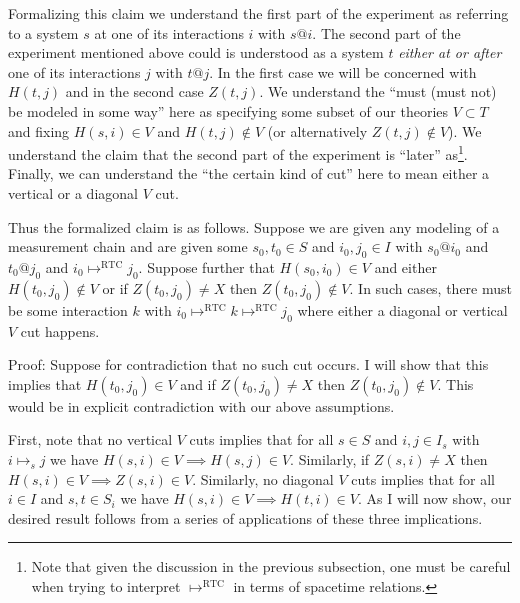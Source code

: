 \documentclass[prd,twocolumn,superscriptaddress,floatfix,amsmath,amssymb,amsfonts,nofootinbib]{revtex4-2}
\begin{document}
Formalizing this claim we understand the first part of the experiment as referring to a system $s$ at one of its interactions $i$ with $s@i$. The second part of the experiment mentioned above could is understood as a system $t$ \textit{either at or after} one of its interactions $j$ with $t@j$. In the first case we will be concerned with $H(t,j)$ and in the second case $Z(t,j)$. We understand the ``must (must not) be modeled in some way'' here as specifying some subset of our theories $V\subset T$ and fixing $H(s,i)\in V$ and $H(t,j)\notin V$ (or alternatively $Z(t,j)\notin V$). We understand the claim that the second part of the experiment is ``later'' as\footnote{Note that given the discussion in the previous subsection, one must be careful when trying to interpret $\mapsto^\text{RTC}$ in terms of spacetime relations.}. Finally, we can understand the ``the certain kind of cut'' here to mean either a vertical or a diagonal $V$ cut.%

Thus the formalized claim is as follows. Suppose we are given any modeling of a measurement chain and are given some $s_0,t_0\in S$ and $i_0,j_0\in I$ with $s_0@i_0$ and $t_0@j_0$ and \mbox{$i_0 \mapsto^\text{RTC}j_0$}. Suppose further that $H(s_0,i_0)\in V$ and either $H(t_0,j_0)\notin V$ or if \mbox{$Z(t_0,j_0)\neq X$} then \mbox{$Z(t_0,j_0)\notin V$}. In such cases, there must be some interaction $k$ with \mbox{$i_0\mapsto^\text{RTC} k \mapsto^\text{RTC} j_0$} where either a diagonal or vertical $V$ cut happens.

Proof: Suppose for contradiction that no such cut occurs. I will show that this implies that $H(t_0,j_0)\in V$ and if $Z(t_0,j_0)\neq X$ then $Z(t_0,j_0)\notin V$. This would be in explicit contradiction with our above assumptions.

First, note that no vertical $V$ cuts implies that for all $s\in S$ and $i,j\in I_s$ with $i\mapsto_s j$ we have \mbox{$H(s,i)\in V\implies H(s,j)\in V$}. Similarly, if $Z(s,i)\neq X$ then \mbox{$H(s,i)\in V\implies Z(s,i)\in V$}. Similarly, no diagonal $V$ cuts implies that for all $i\in I$ and $s,t\in S_i$ we have \mbox{$H(s,i)\in V\implies H(t,i)\in V$}. As I will now show, our desired result follows from a series of applications of these three implications.
\end{document}
